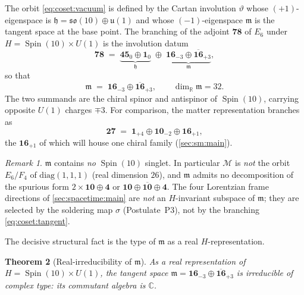 \documentclass[11pt]{article}
\theoremstyle{plain}
\newtheorem{theorem}{Theorem}[section]
\theoremstyle{definition}
\theoremstyle{remark}
\newtheorem{remark}[theorem]{Remark}
\newcommand{\Spin}{\operatorname{Spin}}
\begin{document}
The orbit \eqref{eq:coset:vacuum} is defined by the Cartan involution
$\vartheta$ whose $(+1)$-eigenspace is $\mathfrak h = \mathfrak{so}(10)\oplus
\mathfrak u(1)$ and whose $(-1)$-eigenspace $\mathfrak m$ is the tangent space at
the base point. The branching of the adjoint $\mathbf{78}$ of $E_{6}$ under
$H = \Spin(10)\times U(1)$ is the involution datum
\begin{equation}\label{eq:coset:adjoint}
  \mathbf{78}
  \;=\; \underbrace{\mathbf{45}_{0}\oplus\mathbf 1_{0}}_{\mathfrak h}
       \;\oplus\;
        \underbrace{\mathbf{16}_{-3}\oplus\overline{\mathbf{16}}_{+3}}_{\mathfrak m},
\end{equation}
so that
\begin{equation}\label{eq:coset:tangent}
  \mathfrak m \;=\; \mathbf{16}_{-3}\oplus\overline{\mathbf{16}}_{+3},
  \qquad \dim_{\mathbb R}\mathfrak m = 32 .
\end{equation}
The two summands are the chiral spinor and antispinor of $\Spin(10)$, carrying
opposite $U(1)$ charges $\mp 3$. For comparison, the matter representation
branches as
\begin{equation}\label{eq:coset:fund}
  \mathbf{27} \;=\; \mathbf 1_{+4}\oplus\mathbf{10}_{-2}\oplus\mathbf{16}_{+1},
\end{equation}
the $\mathbf{16}_{+1}$ of which will house one chiral family
(\autoref{sec:sm:main}).

\begin{remark}\label{rem:coset:nosinglet}
$\mathfrak m$ contains \emph{no} $\Spin(10)$ singlet. In particular $\mathcal M$
is \emph{not} the orbit $E_{6}/F_{4}$ of $\mathrm{diag}(1,1,1)$ (real dimension
$26$), and $\mathfrak m$ admits no decomposition of the spurious form
$2\times\mathbf{10}\oplus\mathbf 4$ or $\mathbf{10}\oplus\overline{\mathbf{10}}
\oplus\mathbf 4$. The four Lorentzian frame directions of
\autoref{sec:spacetime:main} are \emph{not} an $H$-invariant subspace of
$\mathfrak m$; they are selected by the soldering map $\sigma$ (Postulate~P3),
not by the branching \eqref{eq:coset:tangent}.
\end{remark}

The decisive structural fact is the type of $\mathfrak m$ as a real
$H$-representation.

\begin{theorem}[Real-irreducibility of $\mathfrak m$]\label{thm:coset:irrep}
As a real representation of $H = \Spin(10)\times U(1)$, the tangent space
$\mathfrak m = \mathbf{16}_{-3}\oplus\overline{\mathbf{16}}_{+3}$ is irreducible
of \emph{complex type}: its commutant algebra is $\mathbb C$.
\end{theorem}
\end{document}
